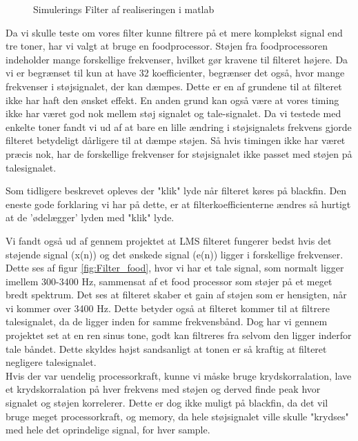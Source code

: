 \begin{description}[align=left]
\begin{figure}[H]
	\caption{Simulerings Filter af realiseringen i matlab}
	\label{fig:filter_matlab}
\end{figure}
\item [Food processor realisering] Da vi skulle teste om vores filter kunne filtrere på et mere komplekst signal end tre toner, har vi valgt at bruge en foodprocessor. Støjen fra foodprocessoren indeholder mange forskellige frekvenser, hvilket gør kravene til filteret højere. Da vi er begrænset til kun at have 32 koefficienter, begrænser det også, hvor mange frekvenser i støjsignalet, der kan dæmpes. Dette er en af grundene til at filteret ikke har haft den ønsket effekt. 
En anden grund kan også være at vores timing ikke har været god nok mellem støj signalet og tale-signalet. Da vi testede med enkelte toner fandt vi ud af at bare en lille ændring i støjsignalets frekvens gjorde filteret betydeligt dårligere til at dæmpe støjen. Så hvis timingen ikke har været præcis nok, har de forskellige frekvenser for støjsignalet ikke passet med støjen på talesignalet.
\item ["klik" lyde.] Som tidligere beskrevet opleves der "klik" lyde når filteret køres på blackfin. Den eneste gode forklaring vi har på dette, er at filterkoefficienterne ændres så hurtigt at de 'ødelægger' lyden med "klik" lyde. 
\item [Bedst udenfor 300-3400 Hz.] Vi fandt også ud af gennem projektet at LMS filteret fungerer bedst hvis det støjende signal (x(n)) og det ønskede signal (e(n)) ligger i forskellige frekvenser. Dette ses af figur \ref{fig:Filter_food}, hvor vi har et tale signal, som normalt ligger imellem 300-3400 Hz, sammensat af et food processor som støjer på et meget bredt spektrum. Det ses at filteret skaber et gain af støjen som er hensigten, når vi kommer over 3400 Hz. Dette betyder også at filteret kommer til at filtrere talesignalet, da de ligger inden for samme frekvensbånd. Dog har vi gennem projektet set at en ren sinus tone, godt kan filtreres fra selvom den ligger inderfor tale båndet. Dette skyldes højst sandsanligt at tonen er så kraftig at filteret negligere talesignalet. \\
Hvis der var uendelig processorkraft, kunne vi måske bruge krydskorralation, lave et krydskorralation på hver frekvens med støjen og derved finde peak hvor signalet og støjen korrelerer. Dette er dog ikke muligt på blackfin, da det vil bruge meget processorkraft, og memory, da hele støjsignalet ville skulle "krydses" med hele det oprindelige signal, for hver sample. 
\item [Ikke-funktionelle krav.]


\end{description}
